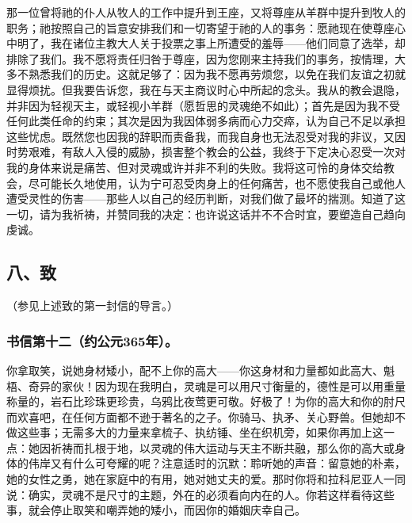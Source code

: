那一位曾将祂的仆人从牧人的工作中提升到王座，又将尊座从羊群中提升到牧人的职务；祂按照自己的旨意安排我们和一切寄望于祂的人的事务：愿祂现在使尊座心中明了，我在诸位主教大人关于投票之事上所遭受的羞辱——他们同意了选举，却排除了我们。我不愿将责任归咎于尊座，因为您刚来主持我们的事务，按情理，大多不熟悉我们的历史。这就足够了：因为我不愿再劳烦您，以免在我们友谊之初就显得烦扰。但我要告诉您，我在与天主商议时心中所起的念头。我从的教会退隐，并非因为轻视天主，或轻视小羊群（愿哲思的灵魂绝不如此）；首先是因为我不受任何此类任命的约束；其次是因为我因体弱多病而心力交瘁，认为自己不足以承担这些忧虑。既然您也因我的辞职而责备我，而我自身也无法忍受对我的非议，又因时势艰难，有敌人入侵的威胁，损害整个教会的公益，我终于下定决心忍受一次对我的身体来说是痛苦、但对灵魂或许并非不利的失败。我将这可怜的身体交给教会，尽可能长久地使用，认为宁可忍受肉身上的任何痛苦，也不愿使我自己或他人遭受灵性的伤害——那些人以自己的经历判断，对我们做了最坏的揣测。知道了这一切，请为我祈祷，并赞同我的决定：也许说这话并不不合时宜，要塑造自己趋向虔诚。\par


\subsection{八、致}

（参见上述致的第一封信的导言。）\par


\subsubsection{书信第十二（约公元365年）。}

你拿取笑，说她身材矮小，配不上你的高大——你这身材和力量都如此高大、魁梧、奇异的家伙！因为现在我明白，灵魂是可以用尺寸衡量的，德性是可以用重量称量的，岩石比珍珠更珍贵，乌鸦比夜莺更可敬。好极了！为你的高大和你的肘尺而欢喜吧，在任何方面都不逊于著名的之子。你骑马、执矛、关心野兽。但她却不做这些事；无需多大的力量来拿梳子、执纺锤、坐在织机旁，如果你再加上这一点：她因祈祷而扎根于地，以灵魂的伟大运动与天主不断共融，那么你的高大或身体的伟岸又有什么可夸耀的呢？注意适时的沉默：聆听她的声音：留意她的朴素，她的女性之勇，她在家庭中的有用，她对她丈夫的爱。那时你将和拉科尼亚人一同说：确实，灵魂不是尺寸的主题，外在的必须看向内在的人。你若这样看待这些事，就会停止取笑和嘲弄她的矮小，而因你的婚姻庆幸自己。\par

